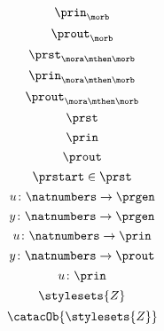 {\begin{forslides}
\begin{equation}
			\prin_{\morb}
		\end{equation}
		\begin{equation}
			\label{eq:morb-prout}
			\prout_{\morb}
		\end{equation}
		\begin{equation}
			\label{eq:morab-prst}
			\prst_{\mora\mthen\morb}
		\end{equation}
		\begin{equation}
			\label{eq:morab-prin}
			\prin_{\mora\mthen\morb}
		\end{equation}
		\begin{equation}
			\label{eq:morab-prout}
			\prout_{\mora\mthen\morb}
		\end{equation}
		\begin{equation}
			\label{eq:gen-prst}
			\prst
		\end{equation}
		\begin{equation}
			\label{eq:gen-prin}
			\prin
		\end{equation}
		\begin{equation}
			\label{eq:gen-prout}
			\prout
		\end{equation}
		\begin{equation}
			\label{eq:moore-start}
			\prstart \in \prst
		\end{equation}
		\begin{equation}
			\label{eq:prgen-u}
			u\colon \natnumbers \to \prgen
		\end{equation}
		\begin{equation}
			\label{eq:prgen-y}
			y\colon \natnumbers \to \prgen
		\end{equation}
		\begin{equation}
			\label{eq:prgen-u-1}
			u\colon \natnumbers \to \prin
		\end{equation}
		\begin{equation}
			\label{eq:prgen-y-1}
			y\colon \natnumbers \to \prout
		\end{equation}
		\begin{equation}
			\label{eq:prgen-u-2}
			u\colon \prin
		\end{equation}
		\begin{equation}
			\label{eq:Z}
			\stylesets{Z}
		\end{equation}
		\begin{equation}
			\label{eq:Za}
			\catacOb{\stylesets{Z}}
		\end{equation}
		\begin{equation}

\end{equation}
\end{forslides}}
